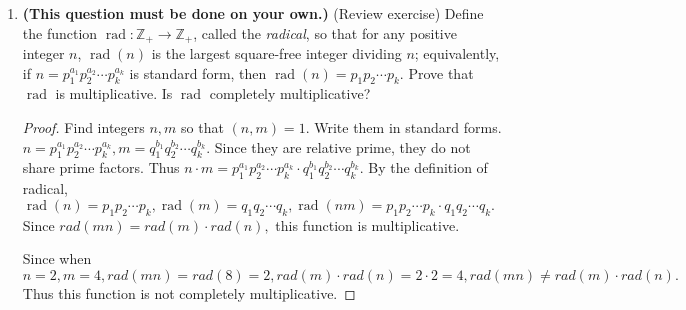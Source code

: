 \documentclass[11pt,a4paper]{article}
\DeclareMathOperator{\rad}{rad}
\newcommand{\Z}{\mathbb{Z}}
\begin{document}
\begin{enumerate}
\begin{proof}
		Since $a_1 \ldots a_k$ are all larger than or equal to 1, $b_i$ would be the smaller of $a_i$ and $b_i$. By Corollary 1.10.2, $(m,n)=p_{1}^{b_{1}} p_{2}^{b_{2}}\cdots p_{k}^{b_{k}}=n.$ Thus, $n \mid m.$
	\end{proof}

	\item \textbf{(This question must be done on your own.)} (Review exercise) Define the function \(\rad : \Z_{+} \to \Z_{+}\), called the \textit{radical}, so that for any positive integer \(n\), \(\rad(n)\) is the largest square-free integer dividing \(n\); equivalently, if \(n = p_{1}^{a_{1}} p_{2}^{a_{2}}\cdots p_{k}^{a_{k}}\) is standard form, then \(\rad\!\left(n\right) = p_{1}p_{2}\cdots p_{k}\). Prove that \(\rad\) is multiplicative. Is \(\rad\) completely multiplicative?

	\begin{proof}
		Find integers $n, m$ so that $(n,m) = 1.$ Write them in standard forms. \(n = p_{1}^{a_{1}} p_{2}^{a_{2}}\cdots p_{k}^{a_{k}}, m = q_{1}^{b_{1}} q_{2}^{b_{2}}\cdots q_{k}^{b_{k}}.\) Since they are relative prime, they do not share prime factors. Thus $n\cdot m = p_{1}^{a_{1}} p_{2}^{a_{2}}\cdots p_{k}^{a_{k}} \cdot q_{1}^{b_{1}} q_{2}^{b_{2}}\cdots q_{k}^{b_{k}}.$ By the definition of radical, \(\rad\!\left(n\right) = p_{1}p_{2}\cdots p_{k}, \rad\!\left(m\right) = q_{1}q_{2}\cdots q_{k}, \rad\!\left(nm\right) = p_{1}p_{2}\cdots p_{k}\cdot q_{1}q_{2}\cdots q_{k}.\) Since $rad(mn) = rad(m)\cdot rad(n),$ this function is multiplicative.

		Since when $n = 2, m = 4, rad(mn) = rad(8) = 2, rad(m)\cdot rad(n) = 2 \cdot 2 = 4, rad(mn) \neq rad(m)\cdot rad(n).$ Thus this function is not completely multiplicative.
	\end{proof}




\end{enumerate}
\end{document}
